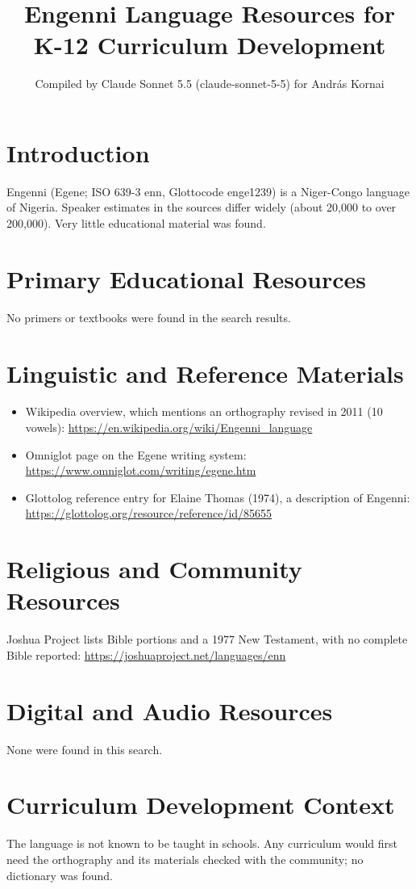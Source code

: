\documentclass[12pt]{article}
\title{Engenni Language Resources for K-12 Curriculum Development}
\author{Compiled by Claude Sonnet 5.5 (claude-sonnet-5-5) for Andr\'as Kornai}
\date{}
\begin{document}
\maketitle
\section{Introduction}
Engenni (Egene; ISO 639-3 enn, Glottocode enge1239) is a Niger-Congo language of Nigeria. Speaker estimates in the sources differ widely (about 20,000 to over 200,000). Very little educational material was found.
\section{Primary Educational Resources}
No primers or textbooks were found in the search results.
\section{Linguistic and Reference Materials}
\begin{itemize}
\item Wikipedia overview, which mentions an orthography revised in 2011 (10 vowels): \url{https://en.wikipedia.org/wiki/Engenni_language}
\item Omniglot page on the Egene writing system: \url{https://www.omniglot.com/writing/egene.htm}
\item Glottolog reference entry for Elaine Thomas (1974), a description of Engenni: \url{https://glottolog.org/resource/reference/id/85655}
\end{itemize}
\section{Religious and Community Resources}
Joshua Project lists Bible portions and a 1977 New Testament, with no complete Bible reported: \url{https://joshuaproject.net/languages/enn}
\section{Digital and Audio Resources}
None were found in this search.
\section{Curriculum Development Context}
The language is not known to be taught in schools. Any curriculum would first need the orthography and its materials checked with the community; no dictionary was found.
\end{document}
